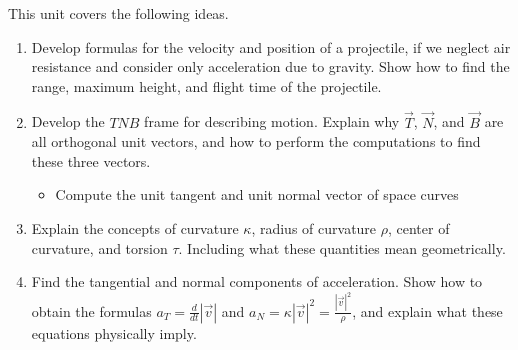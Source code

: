 
\newcommand{\sageurlforcurvature}{http://bmw.byuimath.com/dokuwiki/doku.php?id=curvature_calculator}


\noindent 
This unit covers the following ideas.  
\begin{enumerate}
 \item Develop formulas for the velocity and position of a projectile, if we neglect air resistance and consider only acceleration due to gravity. Show how to find the range, maximum height, and flight time of the projectile.
 \item Develop the $TNB$ frame for describing motion. Explain why $\vec T$, $\vec N$, and $\vec B$ are all orthogonal unit vectors, and how to perform the computations to find these three vectors.
\begin{itemize}
	\item Compute the unit tangent and unit normal vector of space curves
\end{itemize}
 \item Explain the concepts of curvature $\kappa$, radius of curvature $\rho$, center of curvature, and torsion $\tau$. Including what these quantities mean geometrically.
 \item Find the tangential and normal components of acceleration. Show how to obtain the formulas $a_T=\frac{d}{dt}|\vec v|$ and $a_N=\kappa |\vec v|^2=\frac{|\vec v|^2}{\rho}$, and explain what these equations physically imply.
\end{enumerate}


